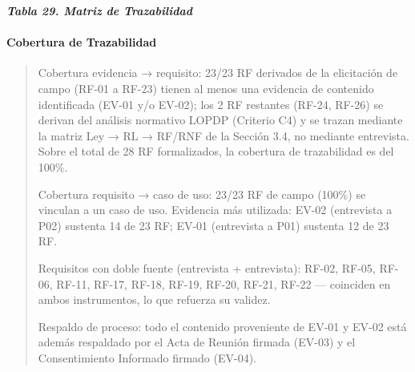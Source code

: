 \documentclass[
]{article}
\begin{document}
\protect{}\label{_bookmark113}{}\emph{\textbf{Tabla 29.
Matriz de Trazabilidad}}

\paragraph{Cobertura de Trazabilidad}\label{cobertura-de-trazabilidad}

\begin{quote}
Cobertura evidencia → requisito: 23/23 RF derivados de la elicitación de
campo (RF-01 a RF-23) tienen al menos una evidencia de contenido
identificada (EV-01 y/o EV-02); los 2 RF restantes (RF-24, RF-26) se
derivan del análisis normativo LOPDP (Criterio C4) y se trazan mediante
la matriz Ley → RL → RF/RNF de la Sección 3.4, no mediante entrevista.
Sobre el total de 28 RF formalizados, la cobertura de trazabilidad es
del 100\%.

Cobertura requisito → caso de uso: 23/23 RF de campo (100\%) se vinculan
a un caso de uso. Evidencia más utilizada: EV-02 (entrevista a P02)
sustenta 14 de 23 RF; EV-01 (entrevista a P01) sustenta 12 de 23 RF.

Requisitos con doble fuente (entrevista + entrevista): RF-02, RF-05,
RF-06, RF-11, RF-17, RF-18, RF-19, RF-20, RF-21, RF-22 --- coinciden en
ambos instrumentos, lo que refuerza su validez.

Respaldo de proceso: todo el contenido proveniente de EV-01 y EV-02 está
además respaldado por el Acta de Reunión firmada (EV-03) y el
Consentimiento Informado firmado (EV-04).
\end{quote}


\end{document}
